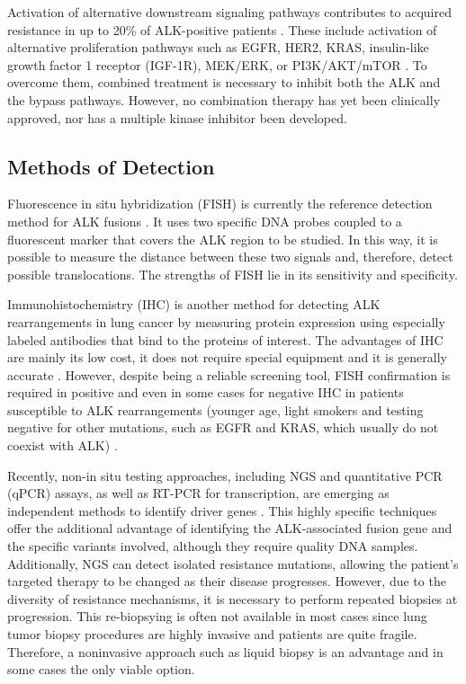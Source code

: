 Activation of alternative downstream signaling pathways contributes to acquired resistance in up to 20\% of ALK-positive patients \cite{TKI_acquired, Bypass}. These include activation of alternative proliferation pathways such as EGFR, HER2, KRAS, insulin-like growth factor 1 receptor (IGF-1R), MEK\slash ERK, or PI3K\slash AKT\slash mTOR \cite{ALK_resistance}. To overcome them, combined treatment is necessary to inhibit both the ALK and the bypass pathways. However, no combination therapy has yet been clinically approved, nor has a multiple kinase inhibitor been developed.

\subsection{Methods of Detection}

Fluorescence in situ hybridization (FISH) is currently the reference detection method for ALK fusions \cite{EML4_ALK_variants}. It uses two specific DNA probes coupled to a fluorescent marker that covers the ALK region to be studied. In this way, it is possible to measure the distance between these two signals and, therefore, detect possible translocations. The strengths of FISH lie in its sensitivity and specificity.

Immunohistochemistry (IHC) is another method for detecting ALK rearrangements in lung cancer by measuring protein expression using especially labeled antibodies that bind to the proteins of interest. The advantages of IHC are mainly its low cost, it does not require special equipment and it is generally accurate \cite{ALK_inhibitors}. However, despite being a reliable screening tool, FISH confirmation is required in positive and even in some cases for negative IHC in patients susceptible to ALK rearrangements (younger age, light smokers and testing negative for other mutations, such as EGFR and KRAS, which usually do not coexist with ALK) \cite{FISH_IHC}.

Recently, non-in situ testing approaches, including NGS and quantitative PCR (qPCR) assays, as well as RT-PCR for transcription, are emerging as independent methods to identify driver genes \cite{EML4_ALK_variants}. This highly specific techniques offer the additional advantage of identifying the ALK-associated fusion gene and the specific variants involved, although they require quality DNA samples. Additionally, NGS can detect isolated resistance mutations, allowing the patient's targeted therapy to be changed as their disease progresses. However, due to the diversity of resistance mechanisms, it is necessary to perform repeated biopsies at progression. This re-biopsying is often not available in most cases since lung tumor biopsy procedures are highly invasive and patients are quite fragile. Therefore, a noninvasive approach such as liquid biopsy is an advantage and in some cases the only viable option.


